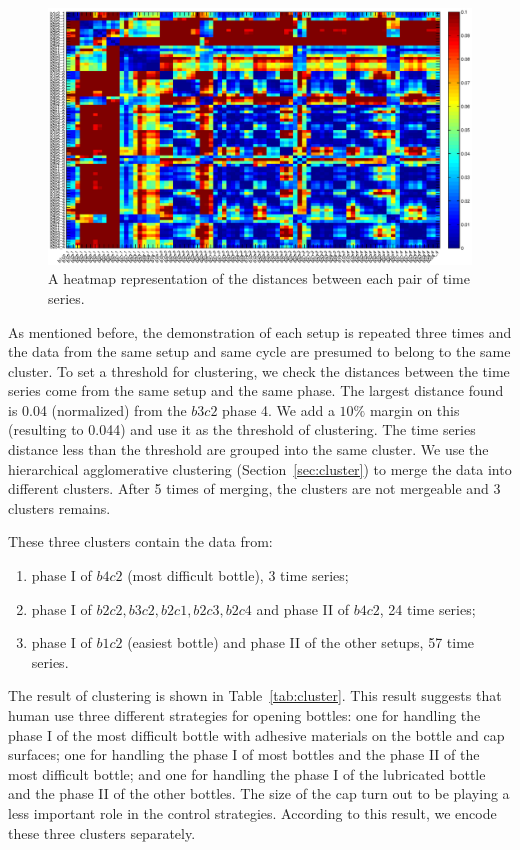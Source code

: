 \documentclass[preprint,12pt]{elsarticle}
\begin{document}
\begin{figure}
\label{heatmap}
  \centering
  \includegraphics[width=17cm]{./fig/heatmap_all4.eps}
  \caption{ \scriptsize{A heatmap representation of the distances between each pair of time series.}
}
\label{fig:heatmap}
\end{figure}

As mentioned before, the demonstration of each setup is repeated three times and the data from the same setup and same cycle are presumed to belong to the same cluster. To set a threshold for clustering, we check the distances between the time series come from the same setup and the same phase. The largest distance found is 0.04 (normalized) from the $b3c2$ phase 4. We add a $10\%$ margin on this (resulting to 0.044) and use it as the threshold of clustering. The time series distance less than the threshold are grouped into the same cluster. We use the hierarchical agglomerative clustering (Section~\ref{sec:cluster}) to merge the data into different clusters. After 5 times of merging, the clusters are not mergeable and 3 clusters remains.

These three clusters contain the data from:

\begin{enumerate}
\item phase I of $b4c2$ (most difficult bottle), 3 time series;
\item phase I of $b2c2, b3c2, b2c1, b2c3, b2c4$ and phase II of $b4c2$, 24 time series;
\item phase I of $b1c2$ (easiest bottle) and phase II of the other setups, 57 time series.
\end{enumerate}

The result of clustering is shown in Table~\ref{tab:cluster}. This result suggests that human use three different strategies for opening bottles: one for handling the phase I of the most difficult bottle with adhesive materials on the bottle and cap surfaces; one for handling the phase I of most bottles and the phase II of the most difficult bottle; and one for handling the phase I of the lubricated bottle and the phase II of the other bottles. The size of the cap turn out to be playing a less important role in the control strategies. According to this result, we encode these three clusters separately.
\end{document}
